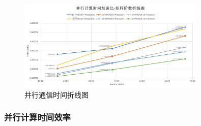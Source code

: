 \documentclass[UTF8]{article}
\begin{document}
    \begin{figure}[h]
        \label{Ratio}
        \centering
            \includegraphics[width=0.8\textwidth]{pcr.png}
            \caption{并行通信时间折线图}
        \end{figure}

        \clearpage

\subsubsection{并行计算时间效率}
\end{document}
